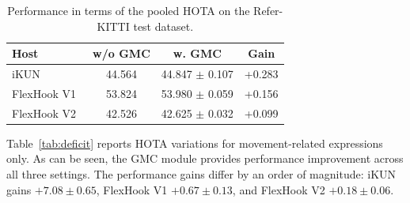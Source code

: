 \documentclass{article}
\begin{document}

\begin{table}
  \centering
  \caption{Performance in terms of the pooled HOTA on the Refer-KITTI test dataset.}
  \label{tab:main}
  \small
  \setlength{\tabcolsep}{2pt}
  \begin{tabular}{lccc}
    \hline
    Host                        & w/o GMC & w. GMC           & Gain                      \\
    \hline
    iKUN~\cite{ikun}            & 44.564    & 44.847 $\pm$ 0.107 & +0.283 \\
    FlexHook V1~\cite{flexhook} & 53.824    & 53.980 $\pm$ 0.059 & +0.156 \\
    FlexHook V2~\cite{flexhook} & 42.526    & 42.625 $\pm$ 0.032 & +0.099 \\
    \hline
  \end{tabular}
\end{table}


Table~\ref{tab:deficit} reports HOTA variations for movement-related expressions only. As can be seen, the GMC module provides performance improvement across all three settings. The performance gains differ by an order of magnitude: iKUN gains $+7.08\pm0.65$, FlexHook V1 $+0.67\pm0.13$, and FlexHook V2 $+0.18\pm0.06$.


\end{document}
